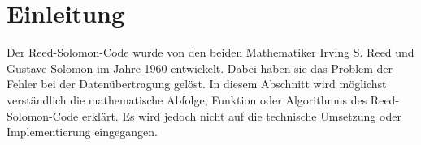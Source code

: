%
%
%
\section{Einleitung
\label{reedsolomon:section:einleitung}}
Der Reed-Solomon-Code wurde von den beiden Mathematiker Irving S. Reed und Gustave Solomon im Jahre 1960 entwickelt.
Dabei haben sie das Problem der Fehler bei der Datenübertragung gelöst.
In diesem Abschnitt wird möglichst verständlich die mathematische Abfolge, 
Funktion oder Algorithmus des Reed-Solomon-Code erklärt.
Es wird jedoch nicht auf die technische Umsetzung oder Implementierung eingegangen.




